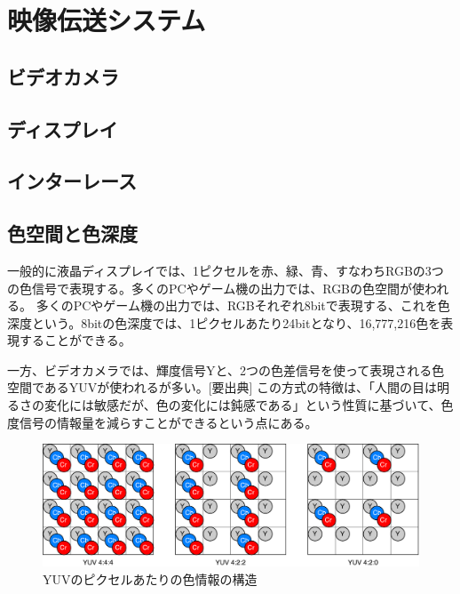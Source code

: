 \chapter{映像伝送システム}
\label{chap:video-transmission}

\section{ビデオカメラ}
\label{sec:camera}


\section{ディスプレイ}
\label{sec:display}


\section{インターレース}
\label{sec:interlace}


\section{色空間と色深度}
\label{sec:colorspace}

一般的に液晶ディスプレイでは、1ピクセルを赤、緑、青、すなわちRGBの3つの色信号で表現する。多くのPCやゲーム機の出力では、RGBの色空間が使われる。
多くのPCやゲーム機の出力では、RGBそれぞれ8bitで表現する、これを色深度という。8bitの色深度では、1ピクセルあたり24bitとなり、16,777,216色を表現することができる。

一方、ビデオカメラでは、輝度信号Yと、2つの色差信号を使って表現される色空間であるYUVが使われるが多い。[要出典]
この方式の特徴は、「人間の目は明るさの変化には敏感だが、色の変化には鈍感である」という性質に基づいて、色度信号の情報量を減らすことができるという点にある。

\begin{figure}[htbp]
    \begin{center}
        \includegraphics[bb=0 0 681 222,width=14cm]{img/yuv-pixel-structure.pdf}
    \end{center}
    \caption{YUVのピクセルあたりの色情報の構造}
    \label{fig:yuv-pixel-structure}
\end{figure}

